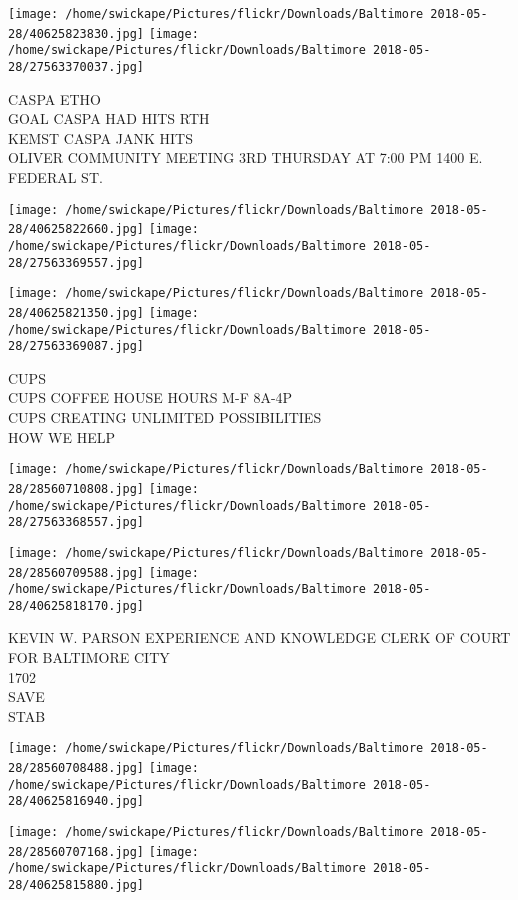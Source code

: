 \documentclass[10pt,letterpaper]{article}
\begin{document}
\texttt{[image: /home/swickape/Pictures/flickr/Downloads/Baltimore 2018-05-28/40625823830.jpg]}
\texttt{[image: /home/swickape/Pictures/flickr/Downloads/Baltimore 2018-05-28/27563370037.jpg]}

CASPA ETHO\\
GOAL CASPA HAD HITS RTH\\
KEMST CASPA JANK HITS\\
OLIVER COMMUNITY MEETING 3RD THURSDAY AT 7:00 PM 1400 E. FEDERAL ST.\\
\pagebreak

\texttt{[image: /home/swickape/Pictures/flickr/Downloads/Baltimore 2018-05-28/40625822660.jpg]}
\texttt{[image: /home/swickape/Pictures/flickr/Downloads/Baltimore 2018-05-28/27563369557.jpg]}

\texttt{[image: /home/swickape/Pictures/flickr/Downloads/Baltimore 2018-05-28/40625821350.jpg]}
\texttt{[image: /home/swickape/Pictures/flickr/Downloads/Baltimore 2018-05-28/27563369087.jpg]}

CUPS\\
CUPS COFFEE HOUSE HOURS M{-}F 8A{-}4P\\
CUPS CREATING UNLIMITED POSSIBILITIES\\
HOW WE HELP\\
\pagebreak

\texttt{[image: /home/swickape/Pictures/flickr/Downloads/Baltimore 2018-05-28/28560710808.jpg]}
\texttt{[image: /home/swickape/Pictures/flickr/Downloads/Baltimore 2018-05-28/27563368557.jpg]}

\texttt{[image: /home/swickape/Pictures/flickr/Downloads/Baltimore 2018-05-28/28560709588.jpg]}
\texttt{[image: /home/swickape/Pictures/flickr/Downloads/Baltimore 2018-05-28/40625818170.jpg]}

KEVIN W. PARSON EXPERIENCE AND KNOWLEDGE CLERK OF COURT FOR BALTIMORE CITY\\
1702\\
SAVE\\
STAB\\
\pagebreak

\texttt{[image: /home/swickape/Pictures/flickr/Downloads/Baltimore 2018-05-28/28560708488.jpg]}
\texttt{[image: /home/swickape/Pictures/flickr/Downloads/Baltimore 2018-05-28/40625816940.jpg]}

\texttt{[image: /home/swickape/Pictures/flickr/Downloads/Baltimore 2018-05-28/28560707168.jpg]}
\texttt{[image: /home/swickape/Pictures/flickr/Downloads/Baltimore 2018-05-28/40625815880.jpg]}
\end{document}

